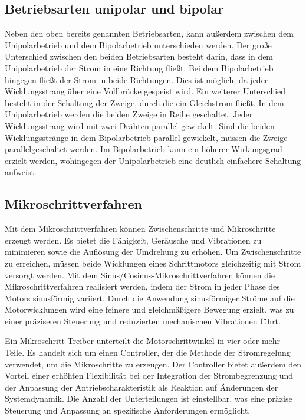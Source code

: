 \subsection{Betriebsarten unipolar und bipolar}

Neben den oben bereits genannten Betriebsarten, kann außerdem zwischen dem Unipolarbetrieb und dem Bipolarbetrieb unterschieden werden. Der große Unterschied zwischen den beiden Betriebsarten besteht darin, dass in dem Unipolarbetrieb der Strom in eine Richtung fließt. Bei dem Bipolarbetrieb hingegen fließt der Strom in beide Richtungen. Dies ist möglich, da jeder Wicklungsstrang über eine Vollbrücke gespeist wird. Ein weiterer Unterschied besteht in der Schaltung der Zweige, durch die ein Gleichstrom fließt. In dem Unipolarbetrieb werden die beiden Zweige in Reihe geschaltet. Jeder Wicklungsstrang wird mit zwei Drähten parallel gewickelt. Sind die beiden Wicklungsstränge in dem Bipolarbetrieb parallel gewickelt, müssen die Zweige parallelgeschaltet werden. Im Bipolarbetrieb kann ein höherer Wirkungsgrad erzielt werden, wohingegen der Unipolarbetrieb eine deutlich einfachere Schaltung aufweist. \cite{Schroder.2021}

\subsection{Mikroschrittverfahren}

Mit dem Mikroschrittverfahren können Zwischenschritte und Mikroschritte erzeugt werden. Es bietet die Fähigkeit, Geräusche und Vibrationen zu minimieren sowie die Auflösung der Umdrehung zu erhöhen. Um Zwischenschritte zu erreichen, müssen beide Wicklungen eines Schrittmotors gleichzeitig mit Strom versorgt werden. 
Mit dem Sinus/Cosinus-Mikroschrittverfahren können die Mikroschrittverfahren realisiert werden, indem der Strom in jeder Phase des Motors sinusförmig variiert. Durch die Anwendung sinusförmiger Ströme auf die Motorwicklungen wird eine feinere und gleichmäßigere Bewegung erzielt, was zu einer präziseren Steuerung und reduzierten mechanischen Vibrationen führt.\cite{MarcMcComb.2024}
  
Ein Mikroschritt-Treiber unterteilt die Motorschrittwinkel in vier oder mehr Teile. Es handelt sich um einen Controller, der die Methode der Stromregelung verwendet, um die Mikroschritte zu erzeugen. Der Controller bietet außerdem den Vorteil einer erhöhten Flexibilität bei der Integration der Strombegrenzung und der Anpassung der Antriebscharakteristik als Reaktion auf Änderungen der Systemdynamik. Die Anzahl der Unterteilungen ist einstellbar, was eine präzise Steuerung und Anpassung an spezifische Anforderungen ermöglicht.\cite{Babiel.2023}

